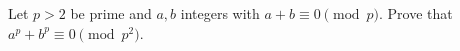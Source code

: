 Let $p>2$ be prime and $a,b$ integers with $a+b\equiv0\pmod p$. Prove that $a^p+b^p\equiv0\pmod{p^2}$.

